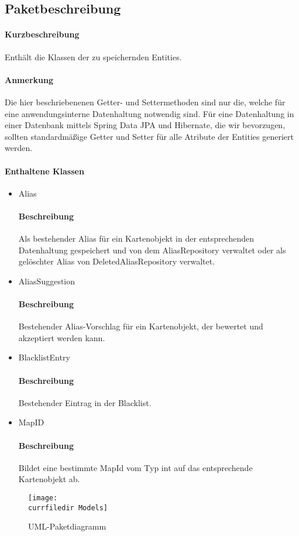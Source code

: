 \subsection*{Paketbeschreibung}%
\paragraph*{Kurzbeschreibung}
    Enthält die Klassen der zu speichernden Entities.
\paragraph*{Anmerkung}  
    Die hier beschriebenenen Getter- und Settermethoden sind nur die, welche für eine anwendungsinterne Datenhaltung 
    notwendig sind. Für eine Datenhaltung in einer Datenbank mittels Spring Data JPA und Hibernate, die wir bevorzugen, sollten 
    standardmäßige Getter und Setter für alle Atribute der Entities generiert werden.
\paragraph*{Enthaltene Klassen}
\begin{itemize}
    \item Alias
    		\paragraph*{Beschreibung}
            Als bestehender Alias für ein Kartenobjekt in der entsprechenden Datenhaltung gespeichert und von 
            dem AliasRepository verwaltet oder als gelöschter Alias von DeletedAliasRepository verwaltet.
    \item AliasSuggestion
    		\paragraph*{Beschreibung}
          Bestehender Alias-Vorschlag für ein Kartenobjekt, der bewertet und akzeptiert werden kann.
    \item BlacklistEntry 
            \paragraph{Beschreibung}
          Bestehender Eintrag in der Blacklist.
    \item MapID
            \paragraph{Beschreibung} 
          Bildet eine bestimmte MapId vom Typ int auf das entsprechende Kartenobjekt ab.
\end{itemize}

\begin{figure}
  \centering
  \texttt{[image: \\currfiledir Models]}
  \caption{UML-Paketdiagramm}
\end{figure}